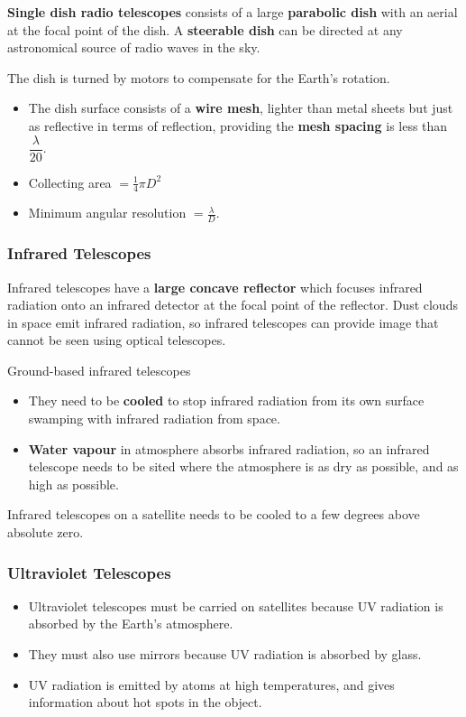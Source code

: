 \textbf{Single dish radio telescopes} consists of a large \textbf{parabolic dish} with an aerial at the focal point of the dish. A \textbf{steerable dish} can be directed at any astronomical source of radio waves in the sky.

The dish is turned by motors to compensate for the Earth's rotation.

\begin{itemize}
    \item The dish surface consists of a \textbf{wire mesh}, lighter than metal sheets but just as reflective in terms of reflection, providing the \textbf{mesh spacing} is less than $\dfrac{\lambda}{20}$.
    \item Collecting area $=\frac{1}{4}\pi D^2$
    \item Minimum angular resolution $=\frac{\lambda}{D}$.
\end{itemize}

\subsubsection*{Infrared Telescopes}

Infrared telescopes have a \textbf{large concave reflector} which focuses infrared radiation onto an infrared detector at the focal point of the reflector. Dust clouds in space emit infrared radiation, so infrared telescopes can provide image that cannot be seen using optical telescopes.

Ground-based infrared telescopes
\begin{itemize}
    \item They need to be \textbf{cooled} to stop infrared radiation from its own surface swamping with infrared radiation from space.
    \item \textbf{Water vapour} in atmosphere absorbs infrared radiation, so an infrared telescope needs to be sited where the atmosphere is as dry as possible, and as high as possible.
\end{itemize}

Infrared telescopes on a satellite needs to be cooled to a few degrees above absolute zero.

\subsubsection*{Ultraviolet Telescopes}

\begin{itemize}
    \item Ultraviolet telescopes must be carried on satellites because UV radiation is absorbed by the Earth's atmosphere.
    \item They must also use mirrors because UV radiation is absorbed by glass.
    \item UV radiation is emitted by atoms at high temperatures, and gives information about hot spots in the object.
\end{itemize}

